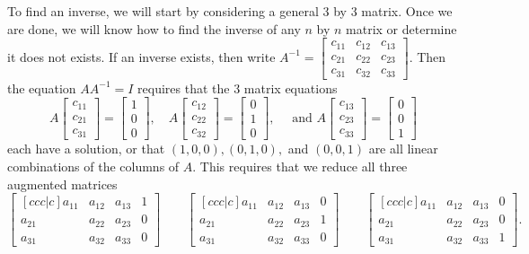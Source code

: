 To find an inverse, we will start by considering a general 3 by 3 matrix. Once we are done, we will know how to find the inverse of any $n$ by $n$ matrix or determine it does not exists.  
If an inverse exists, then write $A^{-1} = \begin{bmatrix}
c_{11}&c_{12}&c_{13}\\ 
c_{21}&c_{22}&c_{23}\\ 
c_{31}&c_{32}&c_{33} 
\end{bmatrix} $. Then the equation $AA^{-1}=I$ requires that the 3 matrix equations
$$A\begin{bmatrix} c_{11}\\ c_{21}\\c_{31}\end{bmatrix} = \begin{bmatrix} 1\\0\\0\end{bmatrix},\quad
A\begin{bmatrix} c_{12}\\ c_{22}\\c_{32}\end{bmatrix} = \begin{bmatrix} 0\\1\\0\end{bmatrix},\quad \text{ and }
A\begin{bmatrix} c_{13}\\ c_{23}\\c_{33}\end{bmatrix} = \begin{bmatrix} 0\\ 0\\1\end{bmatrix}$$
each have a solution, or that $(1,0,0), (0,1,0),$ and  $(0,0,1)$ are all linear combinations of the columns of $A$. This requires that we reduce all three augmented matrices
$$
\begin{bmatrix}[ccc|c]
a_{11}&a_{12}&a_{13}&1\\ 
a_{21}&a_{22}&a_{23}&0\\ 
a_{31}&a_{32}&a_{33}&0 
\end{bmatrix}
\quad\quad
\begin{bmatrix}[ccc|c]
a_{11}&a_{12}&a_{13}&0\\ 
a_{21}&a_{22}&a_{23}&1\\ 
a_{31}&a_{32}&a_{33}&0 
\end{bmatrix}
\quad\quad
\begin{bmatrix}[ccc|c]
a_{11}&a_{12}&a_{13}&0\\ 
a_{21}&a_{22}&a_{23}&0\\ 
a_{31}&a_{32}&a_{33}&1 
\end{bmatrix}.
$$
